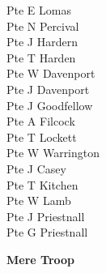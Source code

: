 \begin{multicols}{2}
  Pte E Lomas \\
  Pte N Percival \\
  Pte J Hardern \\
  Pte T Harden \\
  Pte W Davenport \\
  Pte J Davenport \\
  Pte J Goodfellow \\
  Pte A Filcock \\
  Pte T Lockett \\
  Pte W Warrington \\
  Pte J Casey \\
  Pte T Kitchen \\
  Pte W Lamb \\
  Pte J Priestnall \\
  Pte G Priestnall \\
\end{multicols}

\begin{center}
  \Large
  \textbf{Mere Troop}
\end{center}

